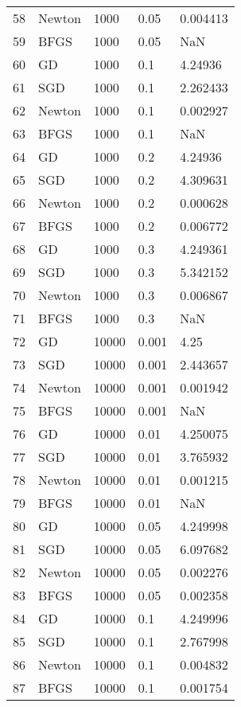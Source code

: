 \begin{tabular}{lllll}
58  &  Newton &     1000 &   0.05 &  0.004413 \\
59  &    BFGS &     1000 &   0.05 &       NaN \\
60  &      GD &     1000 &    0.1 &   4.24936 \\
61  &     SGD &     1000 &    0.1 &  2.262433 \\
62  &  Newton &     1000 &    0.1 &  0.002927 \\
63  &    BFGS &     1000 &    0.1 &       NaN \\
64  &      GD &     1000 &    0.2 &   4.24936 \\
65  &     SGD &     1000 &    0.2 &  4.309631 \\
66  &  Newton &     1000 &    0.2 &  0.000628 \\
67  &    BFGS &     1000 &    0.2 &  0.006772 \\
68  &      GD &     1000 &    0.3 &  4.249361 \\
69  &     SGD &     1000 &    0.3 &  5.342152 \\
70  &  Newton &     1000 &    0.3 &  0.006867 \\
71  &    BFGS &     1000 &    0.3 &       NaN \\
72  &      GD &    10000 &  0.001 &      4.25 \\
73  &     SGD &    10000 &  0.001 &  2.443657 \\
74  &  Newton &    10000 &  0.001 &  0.001942 \\
75  &    BFGS &    10000 &  0.001 &       NaN \\
76  &      GD &    10000 &   0.01 &  4.250075 \\
77  &     SGD &    10000 &   0.01 &  3.765932 \\
78  &  Newton &    10000 &   0.01 &  0.001215 \\
79  &    BFGS &    10000 &   0.01 &       NaN \\
80  &      GD &    10000 &   0.05 &  4.249998 \\
81  &     SGD &    10000 &   0.05 &  6.097682 \\
82  &  Newton &    10000 &   0.05 &  0.002276 \\
83  &    BFGS &    10000 &   0.05 &  0.002358 \\
84  &      GD &    10000 &    0.1 &  4.249996 \\
85  &     SGD &    10000 &    0.1 &  2.767998 \\
86  &  Newton &    10000 &    0.1 &  0.004832 \\
87  &    BFGS &    10000 &    0.1 &  0.001754 \\

\end{tabular}
